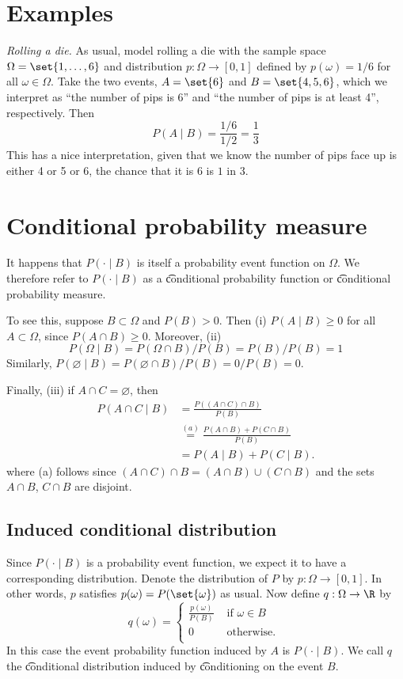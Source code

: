 \section*{Examples}

\textit{Rolling a die.}
As usual, model rolling a die with the sample space $\Omega  = \set{1, \dots , 6}$ and distribution $p: \Omega  \to [0,1]$ defined by $p(\omega ) = 1/6$ for all $\omega  \in \Omega $.
Take the two events, $A = \set{6}$ and $B = \set{4, 5, 6}$, which we interpret as ``the number of pips is 6'' and ``the number of pips is at least 4'', respectively.
Then
\[
P(A \mid  B) = \frac{1/6}{1/2} = \frac{1}{3}
\]
This has a nice interpretation, given that we know the number of pips face up is either 4 or 5 or 6, the chance that it is 6 is $1$ in $3$.

\section*{Conditional probability measure}

It happens that $P(\cdot \mid  B)$ is itself a probability event function on $\Omega $.
We therefore refer to $P(\cdot \mid  B)$ as a \t{conditional probability function} or \t{conditional probability measure}.

To see this, suppose $B \subset \Omega $ and $P(B) > 0$.
Then (i) $P(A \mid  B) \geq 0$ for all $A \subset \Omega $, since $P(A \cap  B) \geq 0$.
Moreover, (ii)
\[
P(\Omega  \mid  B) = P(\Omega  \cap  B)/P(B) = P(B)/P(B) = 1
\]
Similarly, $P(\varnothing \mid  B) = P(\varnothing \cap  B)/P(B) = 0/P(B) = 0$.

Finally, (iii) if $A \cap  C = \varnothing$, then
\[
\begin{aligned}
P(A \cap  C \mid  B)
&= \frac{P((A \cap  C) \cap  B)}{P(B)} \\
&\overset{(a)}{=} \frac{P(A \cap  B) + P(C \cap  B)}{P(B)} \\
&= P(A \mid  B) + P(C \mid  B).
\end{aligned}
\]
where (a) follows since $(A \cap  C) \cap  B = (A \cap  B) \cup (C \cap  B)$ and the sets $A \cap  B$, $C \cap  B$ are disjoint.

\subsection*{Induced conditional distribution}

Since $P(\cdot \mid B)$ is a probability event function, we expect it to have a corresponding distribution.
Denote the distribution of $P$ by $p: \Omega  \to [0,1]$.
In other words, $p$ satisfies $p(\omega ) = P(\set{\omega })$ as usual.
Now define $q: \Omega  \to \R $ by
\[
q(\omega ) = \begin{cases}
\frac{p(\omega )}{P(B)} & \text{ if } \omega  \in B \\
0 & \text{ otherwise. } \\
\end{cases}
\]
In this case the event probability function induced by $A$ is $P(\cdot \mid B)$.
We call $q$ the \t{conditional distribution} induced by \t{conditioning on} the event $B$.


